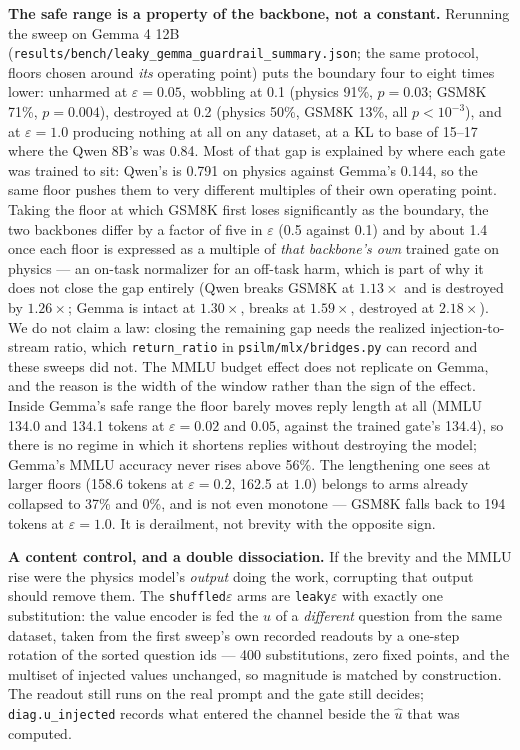 \documentclass[11pt]{article}
\newcommand{\code}[1]{\texttt{#1}}
\begin{document}
\textbf{The safe range is a property of the backbone, not a constant.} Rerunning the sweep on Gemma 4 12B (\code{results/bench/leaky\_gemma\_guardrail\_summary.json}; the same protocol, floors chosen around \emph{its} operating point) puts the boundary four to eight times lower: unharmed at $\varepsilon = 0.05$, wobbling at 0.1 (physics 91\%, $p = 0.03$; GSM8K 71\%, $p = 0.004$), destroyed at 0.2 (physics 50\%, GSM8K 13\%, all $p < 10^{-3}$), and at $\varepsilon = 1.0$ producing nothing at all on any dataset, at a KL to base of 15--17 where the Qwen 8B's was 0.84. Most of that gap is explained by where each gate was trained to sit: Qwen's is 0.791 on physics against Gemma's 0.144, so the same floor pushes them to very different multiples of their own operating point. Taking the floor at which GSM8K first loses significantly as the boundary, the two backbones differ by a factor of five in $\varepsilon$ (0.5 against 0.1) and by about 1.4 once each floor is expressed as a multiple of \emph{that backbone's own} trained gate on physics --- an on-task normalizer for an off-task harm, which is part of why it does not close the gap entirely (Qwen breaks GSM8K at $1.13\times$ and is destroyed by $1.26\times$; Gemma is intact at $1.30\times$, breaks at $1.59\times$, destroyed at $2.18\times$). We do not claim a law: closing the remaining gap needs the realized injection-to-stream ratio, which \code{return\_ratio} in \code{psilm/mlx/bridges.py} can record and these sweeps did not. The MMLU budget effect does not replicate on Gemma, and the reason is the width of the window rather than the sign of the effect. Inside Gemma's safe range the floor barely moves reply length at all (MMLU 134.0 and 134.1 tokens at $\varepsilon = 0.02$ and $0.05$, against the trained gate's 134.4), so there is no regime in which it shortens replies without destroying the model; Gemma's MMLU accuracy never rises above 56\%. The lengthening one sees at larger floors (158.6 tokens at $\varepsilon = 0.2$, 162.5 at $1.0$) belongs to arms already collapsed to 37\% and 0\%, and is not even monotone --- GSM8K falls back to 194 tokens at $\varepsilon = 1.0$. It is derailment, not brevity with the opposite sign.

\textbf{A content control, and a double dissociation.} If the brevity and the MMLU rise were the physics model's \emph{output} doing the work, corrupting that output should remove them. The \code{shuffled}$\varepsilon$ arms are \code{leaky}$\varepsilon$ with exactly one substitution: the value encoder is fed the $\hat u$ of a \emph{different} question from the same dataset, taken from the first sweep's own recorded readouts by a one-step rotation of the sorted question ids --- 400 substitutions, zero fixed points, and the multiset of injected values unchanged, so magnitude is matched by construction. The readout still runs on the real prompt and the gate still decides; \code{diag.u\_injected} records what entered the channel beside the $\hat u$ that was computed.
\end{document}
